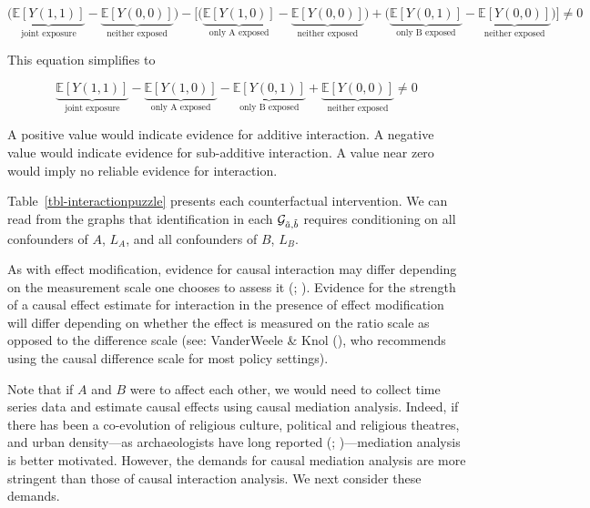 \documentclass[
  single column]{article}
\begin{document}
\[
\bigg(\underbrace{\mathbb{E}[Y(1,1)]}_{\text{joint exposure}} - \underbrace{\mathbb{E}[Y(0,0)]}_{\text{neither exposed}}\bigg) - \bigg[ \bigg(\underbrace{\mathbb{E}[Y(1,0)]}_{\text{only A exposed}} - \underbrace{\mathbb{E}[Y(0,0)]}_{\text{neither exposed}}\bigg) + \bigg(\underbrace{\mathbb{E}[Y(0,1)]}_{\text{only B exposed}} - \underbrace{\mathbb{E}[Y(0,0)]}_{\text{neither exposed}} \bigg)\bigg] \neq 0 
\]

This equation simplifies to

\[ 
\underbrace{\mathbb{E}[Y(1,1)]}_{\text{joint exposure}} - \underbrace{\mathbb{E}[Y(1,0)]}_{\text{only A exposed}} - \underbrace{\mathbb{E}[Y(0,1)]}_{\text{only B exposed}} + \underbrace{\mathbb{E}[Y(0,0)]}_{\text{neither exposed}} \neq 0 
\]

A positive value would indicate evidence for additive interaction. A
negative value would indicate evidence for sub-additive interaction. A
value near zero would imply no reliable evidence for interaction.

Table~\ref{tbl-interactionpuzzle} presents each counterfactual
intervention. We can read from the graphs that identification in each
\(\mathcal{G}_{\Tilde{a}, \Tilde{b}}\) requires conditioning on all
confounders of \(A\), \(L_A\), and all confounders of \(B\), \(L_B\).

As with effect modification, evidence for causal interaction may differ
depending on the measurement scale one chooses to assess it
(;
). Evidence for
the strength of a causal effect estimate for interaction in the presence
of effect modification will differ depending on whether the effect is
measured on the ratio scale as opposed to the difference scale (see:
VanderWeele \& Knol (), who
recommends using the causal difference scale for most policy settings).

Note that if \(A\) and \(B\) were to affect each other, we would need to
collect time series data and estimate causal effects using causal
mediation analysis. Indeed, if there has been a co-evolution of
religious culture, political and religious theatres, and urban
density---as archaeologists have long reported
(;
)---mediation analysis
is better motivated. However, the demands for causal mediation analysis
are more stringent than those of causal interaction analysis. We next
consider these demands.
\end{document}
